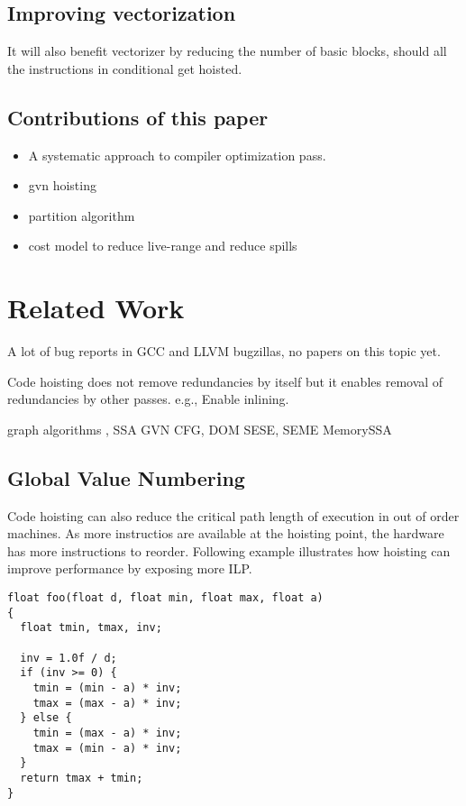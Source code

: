 \documentclass{sig-alternate}
\begin{document}
\subsection{Improving vectorization}
It will also benefit vectorizer by reducing the number
of basic blocks, should all the instructions in conditional get hoisted.


\subsection{Contributions of this paper}
\begin{itemize}
\item A systematic approach to compiler optimization pass.
\item gvn hoisting
\item partition algorithm
\item cost model to reduce live-range and reduce spills
\end{itemize}

\section{Related Work}

A lot of bug reports in GCC and LLVM bugzillas, no papers on this topic yet.

Code hoisting does not remove redundancies by itself but it enables
removal of redundancies by other passes.  e.g., Enable inlining.


graph algorithms \cite{tarjan},
SSA \cite{cytron}
GVN \cite{rosen1988global,click1995global}
CFG, DOM \cite{dragonbook}
SESE, SEME \cite{sese}
MemorySSA \cite{novillo2007memory}

\subsection{Global Value Numbering}

Code hoisting can also reduce the critical path length of execution in out of
order machines. As more instructios are available at the hoisting point, the
hardware has more instructions to reorder. Following example illustrates how
hoisting can improve performance by exposing more ILP.

\begin{verbatim}
float foo(float d, float min, float max, float a)
{
  float tmin, tmax, inv;

  inv = 1.0f / d;
  if (inv >= 0) {
    tmin = (min - a) * inv;
    tmax = (max - a) * inv;
  } else {
    tmin = (max - a) * inv;
    tmax = (min - a) * inv;
  }
  return tmax + tmin;
}
\end{verbatim}
\end{document}
